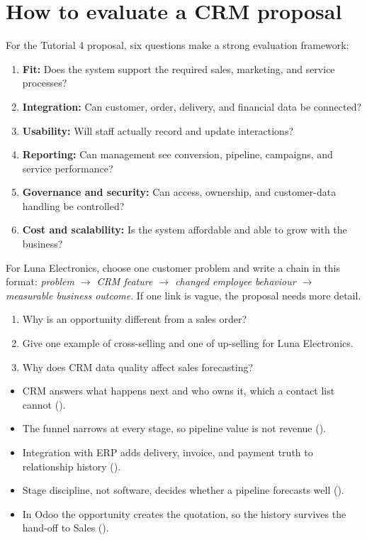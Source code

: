 \section{How to evaluate a CRM proposal}

For the Tutorial 4 proposal, six questions make a strong evaluation framework:

\begin{enumerate}
  \item \textbf{Fit:} Does the system support the required sales, marketing, and service processes?
  \item \textbf{Integration:} Can customer, order, delivery, and financial data be connected?
  \item \textbf{Usability:} Will staff actually record and update interactions?
  \item \textbf{Reporting:} Can management see conversion, pipeline, campaigns, and service performance?
  \item \textbf{Governance and security:} Can access, ownership, and customer-data handling be controlled?
  \item \textbf{Cost and scalability:} Is the system affordable and able to grow with the business?
\end{enumerate}

\begin{tryit}
For Luna Electronics, choose one customer problem and write a chain in this
format: \emph{problem $\rightarrow$ CRM feature $\rightarrow$ changed employee
behaviour $\rightarrow$ measurable business outcome}. If one link is vague, the
proposal needs more detail.
\end{tryit}

\begin{quickcheck}
\begin{enumerate}
  \item Why is an opportunity different from a sales order?
  \item Give one example of cross-selling and one of up-selling for Luna Electronics.
  \item Why does CRM data quality affect sales forecasting?
\end{enumerate}
\end{quickcheck}

\begin{chapterrecap}
\begin{itemize}
  \item CRM answers what happens next and who owns it, which a contact list cannot ().
  \item The funnel narrows at every stage, so pipeline value is not revenue ().
  \item Integration with ERP adds delivery, invoice, and payment truth to relationship history ().
  \item Stage discipline, not software, decides whether a pipeline forecasts well ().
  \item In Odoo the opportunity creates the quotation, so the history survives the hand-off to Sales ().
\end{itemize}
\end{chapterrecap}
